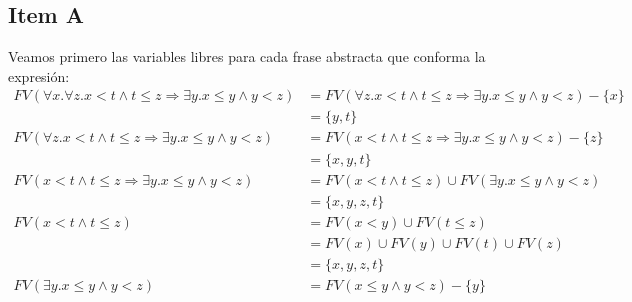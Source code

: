 \documentclass{article}
\begin{document}
\subsection*{Item A}
Veamos primero las variables libres para cada frase abstracta que conforma la expresión:
\begin{equation*}
	\begin{aligned}
		FV(\forall x. \forall z. x < t \land t \leq z \Rightarrow \exists y. x \leq y \land y < z) & = FV(\forall z. x < t \land t \leq z \Rightarrow \exists y. x \leq y \land y < z) - \{x\} \\
		                                                                                           & = \{y, t\}                                                                                \\
		FV(\forall z. x < t \land t \leq z \Rightarrow \exists y. x \leq y \land y < z)            & = FV(x < t \land t \leq z \Rightarrow \exists y. x \leq y \land y < z) - \{z\}            \\
		                                                                                           & = \{x, y, t\}                                                                             \\
		FV(x < t \land t \leq z \Rightarrow \exists y. x \leq y \land y < z)                       & = FV(x < t \land t \leq z) \cup FV(\exists y. x \leq y \land y < z)                       \\
		                                                                                           & = \{x, y, z, t\}                                                                          \\
		FV(x < t \land t \leq z)                                                                   & = FV(x < y) \cup FV(t \leq z)                                                             \\
		                                                                                           & = FV(x) \cup FV(y) \cup FV(t) \cup FV(z)                                                  \\
		                                                                                           & = \{x, y, z, t\}                                                                          \\
		FV(\exists y. x \leq y \land y < z)                                                        & = FV(x \leq y \land y < z) - \{y\}                                                        \\

\end{aligned}
\end{equation*}
\end{document}
